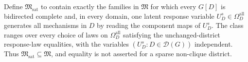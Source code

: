 Define \(\mathfrak M_{\mathrm{sat}}\) to contain exactly the families in \(\mathfrak M\) for which every \(G[D]\) is bidirected complete and, in every domain, one latent response variable \(U_D^s\in\Omega_D^{\mathrm{all}}\) generates all mechanisms in \(D\) by reading the component maps of \(U_D^s\).  The class ranges over every choice of laws on \(\Omega_D^{\mathrm{all}}\) satisfying the unchanged-district response-law equalities, with the variables \((U_D^s:D\in\mathcal D(G))\) independent.  Thus \(\mathfrak M_{\mathrm{sat}}\subseteq\mathfrak M\), and equality is not asserted for a sparse non-clique district.
